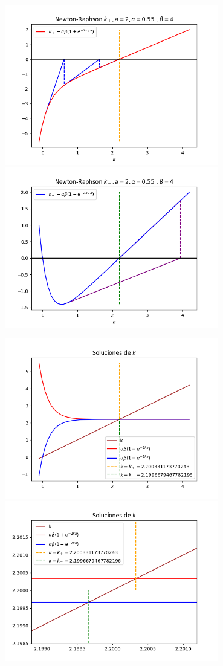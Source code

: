 \documentclass[10pt,a4papper]{article}
\begin{document}
\includegraphics[height=7cm]{nrp.png}
\includegraphics[height=7cm]{nrm.png}

\includegraphics[height=7cm]{sol.png}
\includegraphics[height=7cm]{solz.png}
\end{document}
